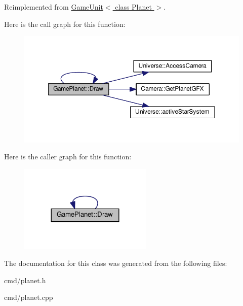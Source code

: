 Reimplemented from \hyperlink{classGameUnit_a86e85603e44428c44307e0e69cf42dc7}{Game\+Unit$<$ class Planet $>$}.



Here is the call graph for this function\+:
\nopagebreak
\begin{figure}[H]
\begin{center}
\leavevmode
\includegraphics[width=350pt]{d6/d6a/classGamePlanet_a006a502b61472d5226bdaf0d55aff6e3_cgraph}
\end{center}
\end{figure}




Here is the caller graph for this function\+:
\nopagebreak
\begin{figure}[H]
\begin{center}
\leavevmode
\includegraphics[width=180pt]{d6/d6a/classGamePlanet_a006a502b61472d5226bdaf0d55aff6e3_icgraph}
\end{center}
\end{figure}




The documentation for this class was generated from the following files\+:\begin{DoxyCompactItemize}
\item 
cmd/planet.\+h\item 
cmd/planet.\+cpp\end{DoxyCompactItemize}
